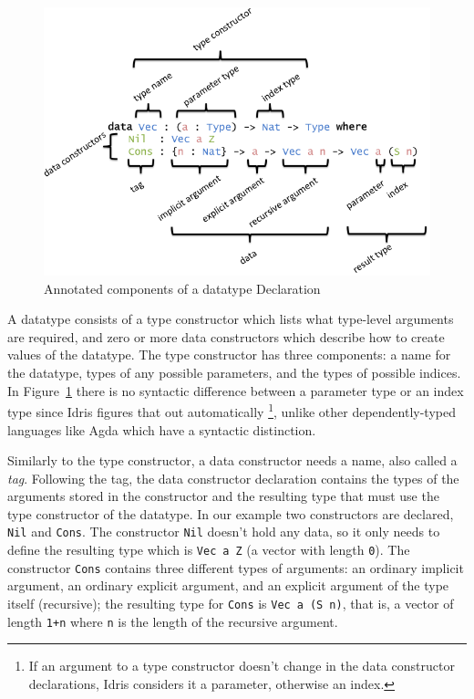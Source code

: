 \documentclass{ituthesis}
\newcommand{\ttconstructor}[1]{\textcolor{constructor-color}{\texttt{#1}}}
\newcommand{\tttype}[1]{\textcolor{type-color}{\texttt{#1}}}
\newcommand{\ttvar}[1]{\textcolor{local-var-color}{\texttt{#1}}}
\newcommand{\ttliteral}[1]{\textcolor{literal-color}{\texttt{#1}}}
\theoremstyle{break}
\begin{document}
\begin{figure}[ht]
\begin{center}
    \includegraphics[scale=0.5]{Figures/AnatomyOfADatatype.png}
\end{center}
\caption{Annotated components of a datatype Declaration}
\label{fig:anatomydatatype}
\end{figure}

A datatype consists of a type constructor which lists what type-level arguments are required, and zero or more data constructors which describe how to create values of the datatype.
The type constructor has three components: a name for the datatype, types of any possible parameters, and the types of possible indices.
In Figure~\ref{fig:anatomydatatype} there is no syntactic difference between a parameter type or an index type since Idris figures that out automatically
\footnote{If an argument to a type constructor doesn't change in the data constructor declarations, Idris considers it a parameter, otherwise an index.},
unlike other dependently-typed languages like Agda which have a syntactic distinction.

Similarly to the type constructor, a data constructor needs a name, also called a \textit{tag}.
Following the tag, the data constructor declaration contains the types of the arguments stored in the constructor and the resulting type that must use the type constructor of the datatype.
In our example two constructors are declared, \ttconstructor{Nil} and \ttconstructor{Cons}.
The constructor \ttconstructor{Nil} doesn't hold any data, so it only needs to define the resulting type which is \tttype{Vec}~\ttvar{a}~\ttconstructor{Z} (a vector with length \ttliteral{0}).
The constructor \ttconstructor{Cons} contains three different types of arguments: an ordinary implicit argument, an ordinary explicit argument, and an explicit argument of the type itself (recursive); the resulting type for \ttconstructor{Cons} is \tttype{Vec}~\ttvar{a}~\texttt{(}\ttconstructor{S}~\ttvar{n}\texttt{)}, that is, a vector of length \ttliteral{1}\texttt{+}\ttvar{n} where \ttvar{n} is the length of the recursive argument.
\end{document}
